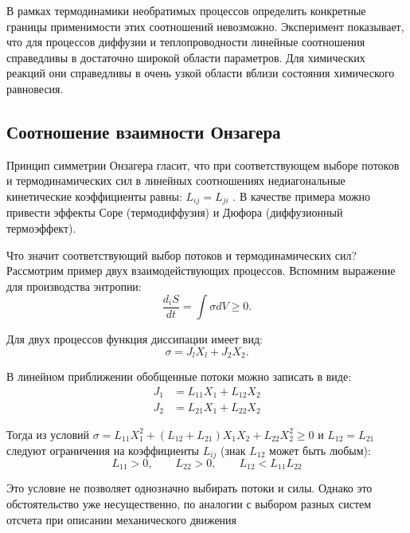 \documentclass[12pt,a4paper,oneside]{book}
\begin{document}
В рамках термодинамики необратимых процессов определить конкретные границы применимости  этих соотношений невозможно. Эксперимент показывает, что для процессов диффузии и теплопроводности линейные соотношения справедливы в достаточно широкой области параметров. Для  химических реакций они справедливы в очень узкой области вблизи состояния химического равновесия.

\subsection{Соотношение взаимности Онзагера}

Принцип симметрии Онзагера гласит, что при соответствующем выборе потоков и термодинамических сил в линейных соотношениях недиагональные кинетические коэффициенты равны: $ L_{ij} = L_{ji} $ . В качестве примера можно привести эффекты Соре (термодиффузия) и Дюфора (диффузионный термоэффект).

Что значит соответствующий выбор потоков и термодинамических сил? Рассмотрим пример двух взаимодействующих процессов. Вспомним выражение для производства энтропии:
\begin{equation}
	\frac{d_i S}{dt} = \int \sigma dV \ge 0.
\end{equation}

Для двух процессов функция диссипации имеет вид:
\begin{equation}
	\sigma = J_l X_l + J_2 X_2.
\end{equation}

В линейном приближении обобщенные потоки можно записать в виде: 
\begin{align}
		J_1 & = L_{11}X_1 + L_{12}X_2\\
		J_2 & = L_{21}X_1 + L_{22}X_2 \nonumber
\end{align}

Тогда из условий $\sigma = L_{11}X_1^2 + ( L_{12} + L_{21})X_1 X_2 + L_{22}X_2^2 \ge 0$  и $L_{12} = L_{21}$ следуют ограничения на коэффициенты $L_{ij}$ (знак $L_{12}$ может быть любым):
\begin{equation}
	 L_{11} > 0, \qquad L_{22} > 0, \qquad L_{12} < L_{11} L_{22}
\end{equation}

Это условие не позволяет однозначно выбирать потоки и силы. Однако это обстоятельство уже несущественно, по аналогии с выбором разных систем отсчета при описании механического движения



\newpage
\end{document}
